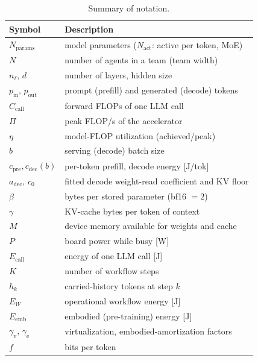 \documentclass[journal]{IEEEtran}
\newif\ifshowchanges \showchangestrue
\newcommand{\OLD}{\ifshowchanges\color{black}\fi}
\newcommand{\ROOF}{\ifshowchanges\color{green!45!black}\fi}
\begin{document}
\begin{table}[t]
\caption{Summary of notation.}
\label{tab:notation}
\centering
\small
\begin{tabular}{@{}ll@{}}
\toprule
Symbol & Description \\
\midrule
$N_{\mathrm{params}}$ & model parameters ($N_{\mathrm{act}}$: active per token, MoE) \\
\ROOF{}$N$\OLD{} & \ROOF{}number of agents in a team (team width)\OLD{} \\
$n_\ell,\, d$ & number of layers, hidden size \\
$p_{\mathrm{in}},\,p_{\mathrm{out}}$ & prompt (prefill) and generated (decode) tokens \\
$C_{\mathrm{call}}$ & forward FLOPs of one LLM call \\
$\Pi$ & peak FLOP/s of the accelerator \\
$\eta$ & model-FLOP utilization (achieved/peak) \\
$b$ & serving (decode) batch size \\
$c_{\mathrm{pre}},c_{\mathrm{dec}}(b)$ & per-token prefill, decode energy [J/tok] \\
\ROOF{}$a_{\mathrm{dec}},\,c_{0}$\OLD{} & \ROOF{}fitted decode weight-read coefficient and KV floor\OLD{} \\
\ROOF{}$\beta$\OLD{} & \ROOF{}bytes per stored parameter (bf16 $=2$)\OLD{} \\
\ROOF{}$\gamma$\OLD{} & \ROOF{}KV-cache bytes per token of context\OLD{} \\
\ROOF{}$M$\OLD{} & \ROOF{}device memory available for weights and cache\OLD{} \\
$P$ & board power while busy [W] \\
$E_{\mathrm{call}}$ & energy of one LLM call [J] \\
$K$ & number of workflow steps \\
$h_k$ & carried-history tokens at step $k$ \\
$E_W$ & operational workflow energy [J] \\
$E_{\mathrm{emb}}$ & embodied (pre-training) energy [J] \\
$\gamma_{\mathrm{v}},\,\gamma_{\mathrm{e}}$ & virtualization, embodied-amortization factors \\
$f$ & bits per token \\
\bottomrule
\end{tabular}
\end{table}

\end{document}
